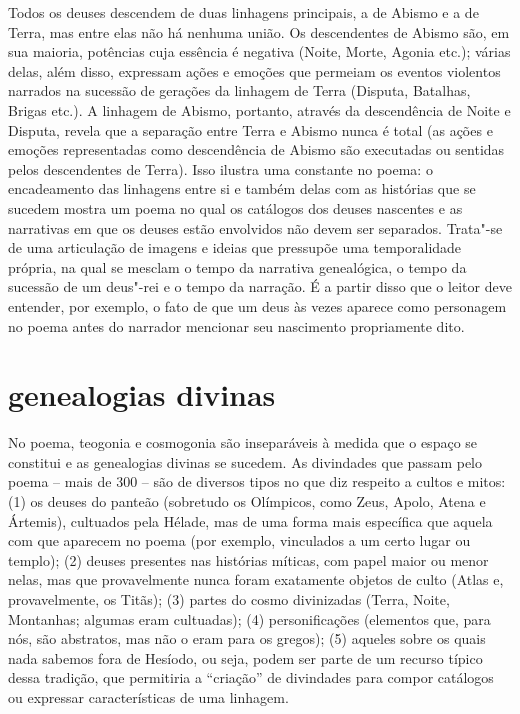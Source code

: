 Todos os deuses descendem de duas linhagens principais, a de Abismo e a de
Terra, mas entre elas não há nenhuma união. Os descendentes de Abismo são, em
sua maioria, potências cuja essência é negativa (Noite, Morte, Agonia etc.);
várias delas, além disso, expressam ações e emoções que permeiam os eventos
violentos narrados na sucessão de gerações da linhagem de Terra (Disputa,
Batalhas, Brigas etc.). A linhagem de Abismo, portanto, através da descendência
de Noite e Disputa, revela que a separação entre Terra e Abismo nunca é total
(as ações e emoções representadas como descendência de Abismo são executadas ou
sentidas pelos descendentes de Terra). Isso ilustra uma constante no
poema: o encadeamento das linhagens entre si e também delas com as histórias
que se sucedem mostra um poema no qual os catálogos dos deuses nascentes e as
narrativas em que os deuses estão envolvidos não devem ser separados. Trata"-se
de uma articulação de imagens e ideias que pressupõe uma temporalidade própria,
na qual se mesclam o tempo da narrativa genealógica, o tempo da sucessão de um
deus"-rei e o tempo da narração. É a partir disso que o leitor
deve entender, por exemplo, o fato de que um deus às vezes aparece como
personagem no poema antes do narrador mencionar seu nascimento propriamente
dito.

\section{genealogias divinas}

No poema, teogonia e cosmogonia são inseparáveis à medida que o espaço se
constitui e as genealogias divinas se sucedem. As divindades que passam pelo
poema – mais de 300 – são de diversos tipos no que diz respeito a cultos e
mitos: (1) os deuses do panteão (sobretudo os Olímpicos, como Zeus, Apolo,
Atena e Ártemis), cultuados pela Hélade, mas de uma forma mais específica que
aquela com que aparecem no poema (por exemplo, vinculados a um certo lugar ou
templo); (2) deuses presentes nas histórias míticas, com papel maior ou menor
nelas, mas que provavelmente nunca foram exatamente objetos de culto (Atlas e,
provavelmente, os Titãs); (3) partes do cosmo divinizadas (Terra, Noite,
Montanhas; algumas eram cultuadas); (4) personificações (elementos que, para
nós, são abstratos, mas não o eram para os gregos); (5) aqueles sobre os quais
nada sabemos fora de Hesíodo, ou seja, podem ser parte de um recurso típico
dessa tradição, que permitiria a “criação” de divindades para compor catálogos
ou expressar características de uma linhagem.

